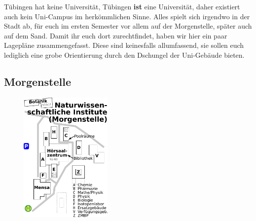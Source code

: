 Tübingen hat keine Universität, Tübingen \textbf{ist} eine Universität, daher existiert auch kein Uni-Campus im herkömmlichen Sinne. Alles spielt sich irgendwo in der Stadt ab, für euch im ersten Semester vor allem auf der Morgenstelle, später auch auf dem Sand. Damit ihr euch dort zurechtfindet, haben wir hier ein paar Lagepläne zusammengefasst. Diese sind keinesfalls allumfassend, sie sollen euch lediglich eine grobe Orientierung durch den Dschungel der Uni-Gebäude bieten.
\subsection*{Morgenstelle}
\begin{figure}[ht!]
\centering
\includegraphics[width=0.4\textwidth]{shared/anhang/lageplaene/uebersicht_morgenstelle.pdf}
\end{figure}
